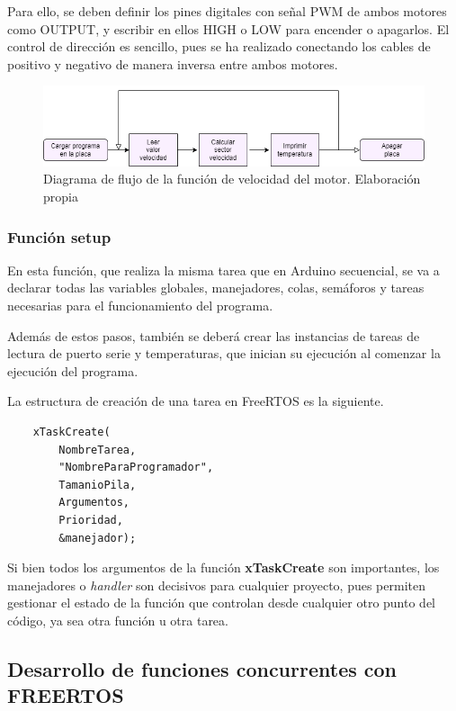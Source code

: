 Para ello, se deben definir los pines digitales con señal PWM de ambos motores como OUTPUT, y escribir en ellos HIGH o LOW para encender o apagarlos. El control de dirección es sencillo, pues se ha realizado conectando los cables de positivo y negativo de manera inversa entre ambos motores. 

\begin{figure}[H]
    \centering
    \includegraphics[width=1\textwidth]{imagenes/diagramas/motor_base.png}
    \caption{Diagrama de flujo de la función de velocidad del motor. Elaboración propia}
\end{figure}



\subsubsection{Función setup}

En esta función, que realiza la misma tarea que en Arduino secuencial, se va a declarar todas las variables globales, manejadores, colas, semáforos y tareas necesarias para el funcionamiento del programa. 

Además de estos pasos, también se deberá crear las instancias de tareas de lectura de puerto serie y temperaturas, que inician su ejecución al comenzar la ejecución del programa. 

La estructura de creación de una tarea en FreeRTOS es la siguiente. 

\begin{verbatim}
    xTaskCreate(
        NombreTarea,
        "NombreParaProgramador",
        TamanioPila,
        Argumentos,
        Prioridad,
        &manejador);
\end{verbatim}

Si bien todos los argumentos de la función \textbf{xTaskCreate} son importantes, los manejadores o \textit{handler} son decisivos para cualquier proyecto, pues permiten gestionar el estado de la función que controlan desde cualquier otro punto del código, ya sea otra función u otra tarea. 

\subsection{Desarrollo de funciones concurrentes con FREERTOS}

